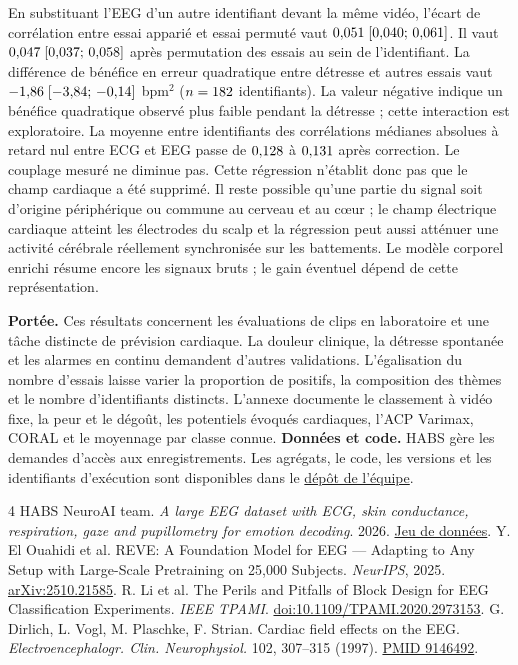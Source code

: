 \documentclass[10pt,a4paper]{article}
\begin{document}
En substituant l’EEG d’un autre identifiant devant la même vidéo, l’écart de corrélation entre essai apparié et essai permuté vaut $0{,}051\;[0{,}040;\,0{,}061]$. Il vaut $0{,}047\;[0{,}037;\,0{,}058]$ après permutation des essais au sein de l’identifiant. La différence de bénéfice en erreur quadratique entre détresse et autres essais vaut $-1{,}86\;[-3{,}84;\,-0{,}14]$ bpm$^2$ ($n=182$ identifiants). La valeur négative indique un bénéfice quadratique observé plus faible pendant la détresse ; cette interaction est exploratoire. La moyenne entre identifiants des corrélations médianes absolues à retard nul entre ECG et EEG passe de $0{,}128$ à $0{,}131$ après correction. Le couplage mesuré ne diminue pas. Cette régression n’établit donc pas que le champ cardiaque a été supprimé. Il reste possible qu’une partie du signal soit d’origine périphérique ou commune au cerveau et au cœur ; le champ électrique cardiaque atteint les électrodes du scalp \cite{dirlich} et la régression peut aussi atténuer une activité cérébrale réellement synchronisée sur les battements. Le modèle corporel enrichi résume encore les signaux bruts ; le gain éventuel dépend de cette représentation.

\textbf{Portée.} Ces résultats concernent les évaluations de clips en laboratoire et une tâche distincte de prévision cardiaque. La douleur clinique, la détresse spontanée et les alarmes en continu demandent d’autres validations. L’égalisation du nombre d’essais laisse varier la proportion de positifs, la composition des thèmes et le nombre d’identifiants distincts. L’annexe documente le classement à vidéo fixe, la peur et le dégoût, les potentiels évoqués cardiaques, l’ACP Varimax, CORAL et le moyennage par classe connue.
\textbf{Données et code.} HABS gère les demandes d’accès aux enregistrements. Les agrégats, le code, les versions et les identifiants d’exécution sont disponibles dans le \href{https://github.com/mathiaschebbah/habs}{dépôt de l’équipe}.
\begin{thebibliography}{4}\small
{} HABS NeuroAI team. \emph{A large EEG dataset with ECG, skin conductance, respiration, gaze and pupillometry for emotion decoding}. 2026. \href{https://huggingface.co/datasets/HABSteam/multimodal-eeg-emotion}{Jeu de données}.
 Y. El Ouahidi et al. REVE: A Foundation Model for EEG --- Adapting to Any Setup with Large-Scale Pretraining on 25,000 Subjects. \emph{NeurIPS}, 2025. \href{https://arxiv.org/abs/2510.21585}{arXiv:2510.21585}.
 R. Li et al. The Perils and Pitfalls of Block Design for EEG Classification Experiments. \emph{IEEE TPAMI}. \href{https://doi.org/10.1109/TPAMI.2020.2973153}{doi:10.1109/TPAMI.2020.2973153}.
 G. Dirlich, L. Vogl, M. Plaschke, F. Strian. Cardiac field effects on the EEG. \emph{Electroencephalogr. Clin. Neurophysiol.} 102, 307--315 (1997). \href{https://pubmed.ncbi.nlm.nih.gov/9146492/}{PMID 9146492}.
\end{thebibliography}
\end{document}
